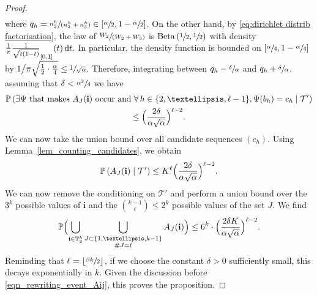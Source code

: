 \documentclass[11pt]{article}
\makeatletter
\newcommand{\spfrac}[2]{\sfrac{#1}{(#2)}}
\newcommand{\bsfrac}[2]{{#1}\big/{#2}}
\DeclareRobustCommand{\mathbbm}[1]{\csname jepbb@#1\endcsname}
\newcommand{\BPp}[1]{\mathbb{P} \Bigl(#1\Bigr)}
\newcommand{\Ppsq}[2]{\mathbb{P} \left(#1\mathrel{}\middle|\mathrel{}#2\right)}
\newcommand{\ii}{\mathbf{i}}
\theoremstyle{plain}
\theoremstyle{definition}
\numberwithin{equation}{section}
\makeatother
\begin{document}
\begin{proof}
\begin{multline*}
\end{multline*}
where $q_h=\spfrac{n^{h}_2}{n^{h}_2+n^{h}_3} \in \left[ \sfrac{\alpha}{2}, 1-\sfrac{\alpha}{2} \right]$.
On the other hand, by \eqref{eq:dirichlet distrib factorisation}, the law of $\spfrac{W_2}{W_2+W_3}$ is $\mathrm{Beta}\left(\sfrac{1}{2},\sfrac{1}{2}\right)$
with density
\(\frac{1}{\pi} \frac{1}{\sqrt{t(1-t)}} \mathbbm{1}_{[0,1]}(t) \, \mathrm{d}t.\)
In particular, the density function is bounded on $\left[ \sfrac{\alpha}{4}, 1-\sfrac{\alpha}{4} \right]$ by $\bsfrac{1}{\pi \sqrt{ \frac{1}{2} \cdot \frac{\alpha}{4}}}\leq \sfrac{1}{\sqrt{\alpha}}$.
Therefore, integrating between $q_h-\sfrac{\delta}{\alpha}$ and $q_h+\sfrac{\delta}{\alpha}$, assuming that $\delta<\sfrac{\alpha^2}{4}$ we have
\begin{multline*}
\Ppsq{\exists \Psi \text{ that makes $A_J(\ii)$ occur and }\forall \, h\in\{2,\dots,\ell-1\}, \Psi(b_h)=c_h}{ \mathcal{T'}} \\ \leq \Bigl( \frac{2\delta}{\alpha\sqrt{\alpha}} \Bigr)^{\ell-2}.
\end{multline*}
We can now take the union bound over all candidate sequences $(c_h)$. Using Lemma~\ref{lem_counting_candidates}, we obtain
\[ \Ppsq{A_J(\ii)}{ \mathcal{T'}} \leq K^{\ell} \Bigl( \frac{2\delta}{\alpha\sqrt{\alpha}} \Bigr)^{\ell-2}.\]
We can now remove the conditioning on $\mathcal{T'}$ and perform a union bound over the $3^k$ possible values of $\ii$ and the $\binom{k-1}{\ell} \leq 2^k$ possible values of the set $J$.
We find
\begin{equation}\label{eq:how small delta has to be}
\BPp{\bigcup_{\ii\in \mathbb{T}_3^k} \bigcup_{\substack{J \subset \{1,\dots,k-1\}\\ \#J=\ell}} A_J(\ii)} \leq 6 ^k \cdot \Bigl( \frac{2\delta K}{\alpha\sqrt{\alpha}} \Bigr)^{\ell-2}.
\end{equation}
Reminding that $\ell=\lfloor\sfrac{\beta k}{2}\rfloor$, if we choose the constant $\delta>0$ sufficiently small, this decays exponentially in $k$.
Given the discussion before \eqref{eqn_rewriting_event_Aij}, this proves the proposition.
\end{proof}
\end{document}
